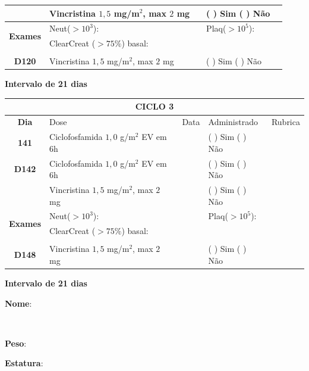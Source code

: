 \documentclass[11pt,a4paper,oldfontcommands]{memoir}
\def\entrywithlabel[#1]#2{\parbox{#1}{{\small #2:} \hrulefill}}
\begin{document}
\begin{center}
\begin{table}[H]
\begin{tabular}{p{1cm}p{6cm}|p{1cm}|p{3cm}|p{2.5cm}}
    \multicolumn{1}{c|}{\multirow{1}{*}{\textbf{}}}&{Vincristina \(1,5\) mg/m\(^2\), max \(2\) mg}&&{(  ) Sim (  ) Não}&\\
    \hline
    \multicolumn{1}{c|}{\multirow{2}{*}{\textbf{Exames}}}&\multicolumn{2}{l|}{Neut(\(>10^3\)):}&{Plaq(\(>10^5\)):}&\\
    \cline{2-5}
    \multicolumn{1}{c|}{\multirow{2}{*}{{}}}&\multicolumn{2}{l|}{ClearCreat (\(>75\%\)) basal:}&{}&{}\\
    \hline
    \\
    \hline
    \multicolumn{1}{c|}{\multirow{1}{*}{\textbf{D120}}}&{Vincristina \(1,5\) mg/m\(^2\), max \(2\) mg}&&{(  ) Sim (  ) Não}&\\
    \hline
\end{tabular}
\end{table}
\textbf{Intervalo de 21 dias}

\begin{table}[H]
\begin{tabular}{p{1cm}p{6cm}|p{1cm}|p{3cm}|p{2.5cm}}
    \hline
	\multicolumn{5}{c}{\textbf{CICLO 3}}\\
	\hline
    \multicolumn{1}{c|}{\multirow{1}{*}{\textbf{Dia}}}&{Dose}&{Data}&{Administrado}&{Rubrica} \\
    \hline
    \multicolumn{1}{c|}{\multirow{1}{*}{\textbf{141}}}&{Ciclofosfamida \(1,0\) g/m\(^2\) EV em 6h}&&{(  ) Sim (  ) Não}&\\
    \multicolumn{1}{c|}{\multirow{1}{*}{\textbf{D142}}}&{Ciclofosfamida \(1,0\) g/m\(^2\) EV em 6h}&&{(  ) Sim (  ) Não}&\\
    \multicolumn{1}{c|}{\multirow{1}{*}{\textbf{}}}&{Vincristina \(1,5\) mg/m\(^2\), max \(2\) mg}&&{(  ) Sim (  ) Não}&\\
    \hline
    \multicolumn{1}{c|}{\multirow{2}{*}{\textbf{Exames}}}&\multicolumn{2}{l|}{Neut(\(>10^3\)):}&{Plaq(\(>10^5\)):}&\\
    \cline{2-5}
    \multicolumn{1}{c|}{\multirow{2}{*}{{}}}&\multicolumn{2}{l|}{ClearCreat (\(>75\%\)) basal:}&{}&{}\\
    \hline
    \\
    \hline
    \multicolumn{1}{c|}{\multirow{1}{*}{\textbf{D148}}}&{Vincristina \(1,5\) mg/m\(^2\), max \(2\) mg}&&{(  ) Sim (  ) Não}&\\
    \hline
\end{tabular}
\end{table}
\textbf{Intervalo de 21 dias}

\pagebreak
    \noindent
\entrywithlabel[1\hsize]{\textbf{Nome}}\hfill
\\[0.3cm]
\entrywithlabel[.45\hsize]{\textbf{Peso}}\hfill  \entrywithlabel[.45\hsize]{\textbf{Estatura}}


\end{center}
\end{document}
